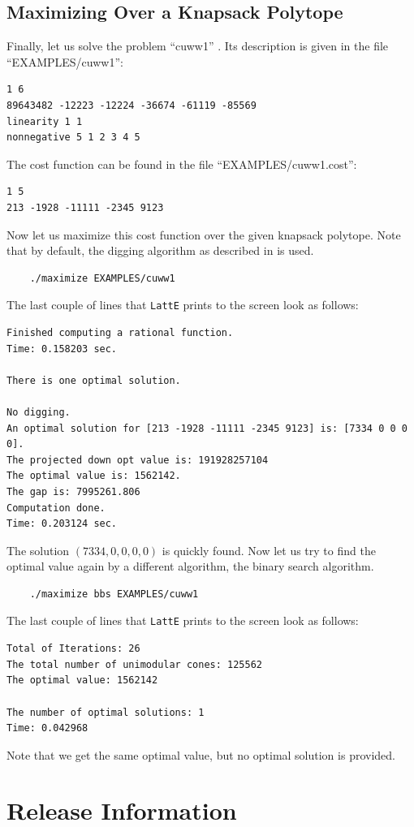 \documentclass{article}
\begin{document}
\subsection{Maximizing Over a Knapsack Polytope}
Finally, let us solve the problem ``cuww1'' \cite{cuww,latte3}. Its
description is given in the file ``EXAMPLES/cuww1'': 
\begin{verbatim}
1 6
89643482 -12223 -12224 -36674 -61119 -85569
linearity 1 1
nonnegative 5 1 2 3 4 5
\end{verbatim}
The cost function can be found in the file ``EXAMPLES/cuww1.cost'':
\begin{verbatim}
1 5
213 -1928 -11111 -2345 9123 
\end{verbatim}
Now let us maximize this cost function over the given knapsack
polytope. Note that by default, the digging algorithm as described in
\cite{latte3} is used.
\begin{verbatim}
    ./maximize EXAMPLES/cuww1
\end{verbatim}
The last couple of lines that {\tt LattE} prints to the screen
look as follows:
{\small
\begin{verbatim}
Finished computing a rational function. 
Time: 0.158203 sec.

There is one optimal solution. 		

No digging.
An optimal solution for [213 -1928 -11111 -2345 9123] is: [7334 0 0 0 0].
The projected down opt value is: 191928257104
The optimal value is: 1562142.
The gap is: 7995261.806
Computation done.
Time: 0.203124 sec.
\end{verbatim}
}
The solution $(7334,0,0,0,0)$ is quickly found. Now let us try to
find the optimal value again by a different algorithm, the binary
search algorithm.
\begin{verbatim}
    ./maximize bbs EXAMPLES/cuww1
\end{verbatim}
The last couple of lines that {\tt LattE} prints to the screen
look as follows:
\begin{verbatim}
Total of Iterations: 26
The total number of unimodular cones: 125562
The optimal value: 1562142

The number of optimal solutions: 1
Time: 0.042968
\end{verbatim}
Note that we get the same optimal value, but no optimal solution is
provided.


\newpage

\section{Release Information}
\end{document}
